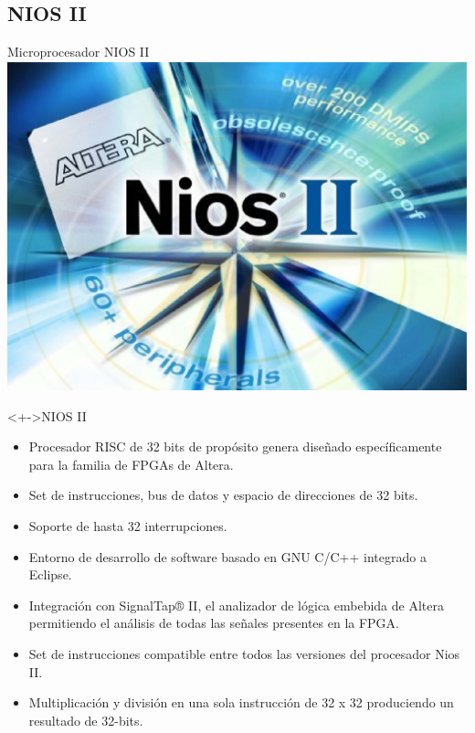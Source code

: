 \documentclass[xcolor=dvipsnames]{beamer}
\begin{document}
\subsection{NIOS II}
\begin{frame}{Microprocesador NIOS II}
\center
\includegraphics[scale=0.20]{figures/nios2.eps}
   \begin{block}<+->{NIOS II}	
    \begin{itemize}
	\scriptsize
     	\item Procesador RISC de 32 bits de propósito genera diseñado específicamente para la familia de FPGAs de Altera.
	\item Set de instrucciones, bus de datos y espacio de direcciones de 32 bits.
	\item Soporte de hasta 32 interrupciones.
	\item Entorno de desarrollo de software basado en GNU C/C++ integrado a Eclipse.
	\item Integración con SignalTap® II, el analizador de lógica embebida de Altera permitiendo el análisis  de todas las señales presentes en la FPGA.
	\item Set de instrucciones compatible entre todos las versiones del procesador Nios II.
	\item Multiplicación y división en una sola instrucción de 32 x 32 produciendo un resultado de 32-bits.
    \end{itemize}
	
  \end{block}
\end{frame}
\end{document}
